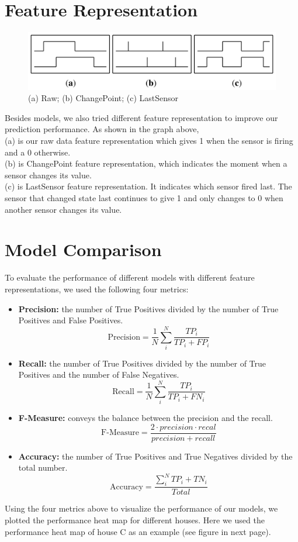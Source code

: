 \documentclass[10pt,letter]{article}
\numberwithin{equation}{section} %
\numberwithin{figure}{section} %
\numberwithin{table}{section} %
\begin{document}
\section{Feature Representation}
\begin{figure}[h]
\centering
\includegraphics[width=14cm]{feature}
\caption{ (a) Raw; (b) ChangePoint; (c) LastSensor}
\end{figure}
Besides models, we also tried different feature representation to improve our prediction performance. 
As shown in the graph above, 
\\(a) is our raw data feature representation which gives 1 when the sensor is firing and a 0 otherwise.  
\\(b) is ChangePoint feature representation, which indicates the moment when a sensor changes its value. 
\\(c) is LastSensor feature representation. It indicates which sensor fired last. The sensor that changed state last continues to give 1 and only changes to 0 when another sensor changes its value.

\section{Model Comparison}
To evaluate the performance of different models with different feature representations, we used the following four metrics:
\begin{itemize}
\item \textbf{Precision:} the number of True Positives divided by the number of True Positives and False Positives.
$$\text{Precision} = \frac{1}{N}\sum^N_i \frac{TP_i}{TP_i+FP_i} $$
\item \textbf{Recall:} the number of True Positives divided by the number of True Positives and the number of False Negatives.
$$\text{Recall} = \frac{1}{N}\sum^N_i\frac{TP_i}{TP_i + FN_i} $$
\item \textbf{F-Measure:} conveys the balance between the precision and the recall.
$$\text{F-Measure} = \frac{2 \cdot precision \cdot recal}{precision+recall} $$
\item \textbf{Accuracy:} the number of True Positives and True Negatives divided by the total number.
$$\text{Accuracy} = \frac{\sum^N_i TP_i + TN_i}{Total}$$
\end{itemize}
Using the four metrics above to visualize the performance of our models, we plotted the performance heat map for different houses. Here we used the performance heat map of house C as an example (see figure in next page).
\end{document}
